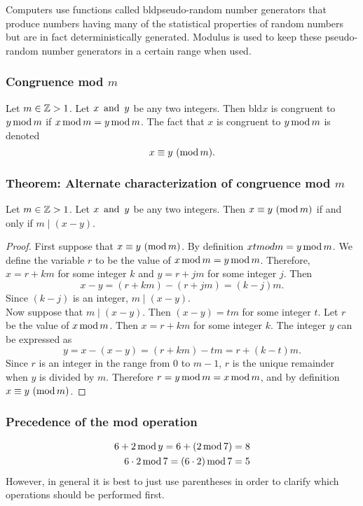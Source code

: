 Computers use functions called bld{pseudo-random number generators} that produce numbers having many of the statistical properties of random numbers but are in fact deterministically generated. Modulus is used to keep these pseudo-random number generators in a certain range when used.

\subsubsection*{Congruence mod $m$}
Let $m \in \mathbb{Z} > 1$. Let $x \operatorname{~\text{and}~} y$ be any two integers. Then bld{$x$ is congruent to $y \operatorname{\text{mod}} m$} if $x \operatorname{\text{mod}} m = y \operatorname{\text{mod}} m$. The fact that $x$ is congruent to $y \operatorname{\text{mod}} m$ is denoted
\[
    x \equiv y~(\operatorname{\text{mod}} m).
\]

\subsubsection*{Theorem: Alternate characterization of congruence mod $m$}
Let $m \in \mathbb{Z} > 1$. Let $x \operatorname{~\text{and}~} y$ be any two integers. Then $x \equiv y~(\operatorname{\text{mod}} m)$ if and only if $m \mid (x-y)$.
\begin{proof}
    First suppose that $x \equiv y~(\operatorname{\text{mod}} m)$. By definition $x tmod m = y \operatorname{\text{mod}} m$. We define the variable $r$ to be the value of $x \operatorname{\text{mod}} m = y \operatorname{\text{mod}} m$. Therefore, $x = r + km$ for some integer $k$ and $y = r + jm$ for some integer $j$. Then
    \[
        x-y = (r+km)-(r+jm) = (k-j)m.
    \]
    Since $(k-j)$ is an integer, $m\mid (x-y)$. \\
    Now suppose that $m\mid (x-y)$. Then $(x-y) = tm$ for some integer $t$. Let $r$ be the value of $x \operatorname{\text{mod}} m$. Then $x = r + km$ for some integer $k$. The integer $y$ can be expressed as
    \[
        y = x - (x-y) = (r+km)-tm = r + (k-t)m.
    \]
    Since $r$ is an integer in the range from $0$ to $m-1$, $r$ is the unique remainder when $y$ is divided by $m$. Therefore $r = y \operatorname{\text{mod}} m = x \operatorname{\text{mod}} m$, and by definition $x \equiv y~(\operatorname{\text{mod}} m)$.
\end{proof}

\subsubsection*{Precedence of the mod operation}
\begin{align*}
    6 + 2 \operatorname{\text{mod}} y = 6 + (2 \operatorname{\text{mod}} 7)         & = 8 \\
    6 \cdot 2 \operatorname{\text{mod}} 7 = (6 \cdot 2) \operatorname{\text{mod}} 7 & = 5 \\
\end{align*}
However, in general it is best to just use parentheses in order to clarify which operations should be performed first.


